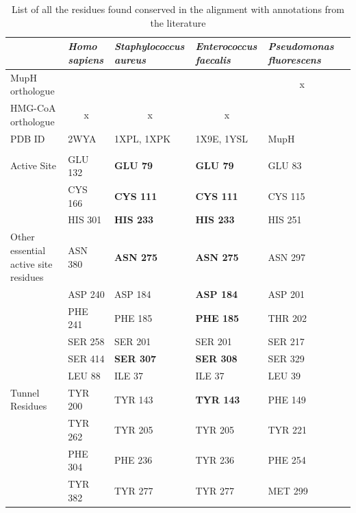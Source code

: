 				\begin{table}[htbp]
				\begin{small}
				\caption{List of all the residues found conserved in the alignment with annotations from the literature}
				\label{tab:MupHconserved_residue}
				\begin{center}
				\begin{threeparttable}[b]
				\begin{tabular}{p{4cm} p{2.5cm} p{2.5cm} p{2.5cm} p{2.5cm} p{2.5cm} }
				\toprule[2pt]
				 & \textit{Homo sapiens} & \textit{Staphylococcus aureus} & \textit{Enterococcus faecalis} & \textit{Pseudomonas fluorescens} \\ 
				 \midrule[1pt]
				MupH orthologue & \multicolumn{1}{c}{} & \multicolumn{1}{c}{} & \multicolumn{1}{c}{} & \multicolumn{1}{c}{x} \\ 
				HMG-CoA orthologue & \multicolumn{1}{c}{x} & \multicolumn{1}{c}{x} & \multicolumn{1}{c}{x} & \multicolumn{1}{c}{} \\ 
				PDB ID & 2WYA & 1XPL, 1XPK & 1X9E, 1YSL & MupH \\ 
				 &  &  &  &  \\ 
				Active Site & GLU 132 & \textbf{GLU 79} & \textbf{GLU 79} & GLU 83 \\ 
				 & CYS 166 & \textbf{CYS 111} & \textbf{CYS 111} & CYS 115 \\ 
				 & HIS 301 & \textbf{HIS 233} & \textbf{HIS 233} & HIS 251 \\ 
				Other essential active site residues & ASN 380 & \textbf{ASN 275} & \textbf{ASN 275} & ASN 297 \\ 
				 & ASP 240 & ASP 184 & \textbf{ASP 184} & ASP 201 \\ 
				 & PHE 241 & PHE 185 & \textbf{PHE 185} & THR 202 \\ 
				 & SER 258 & SER 201 & SER 201 & SER 217 \\ 
				 & SER 414 & \textbf{SER 307} & \textbf{SER 308} & SER 329 \\ 
				 & LEU 88 & ILE 37 & ILE 37 & LEU 39 \\
				Tunnel Residues & TYR 200 & TYR 143 & \textbf{TYR 143} & PHE 149 \\ 
				 & TYR 262 & TYR 205 & TYR 205 & TYR 221 \\ 
				 & PHE 304 & PHE 236 & TYR 236 & PHE 254 \\ 
				 & TYR 382 & TYR 277 & TYR 277 & MET 299 \\ 

\end{tabular}
\end{threeparttable}
\end{center}
\end{small}
\end{table}
